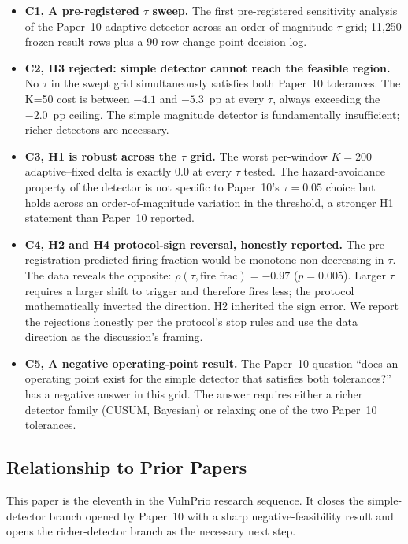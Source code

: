 \begin{itemize}
\item \textbf{C1, A pre-registered $\tau$ sweep.} The first
pre-registered sensitivity analysis of the Paper~10 adaptive detector
across an order-of-magnitude $\tau$ grid; 11{,}250 frozen result rows
plus a 90-row change-point decision log.

\item \textbf{C2, H3 rejected: simple detector cannot reach the
feasible region.} No $\tau$ in the swept grid simultaneously
satisfies both Paper~10 tolerances. The K=50 cost is between $-4.1$
and $-5.3$~pp at every $\tau$, always exceeding the $-2.0$~pp
ceiling. The simple magnitude detector is fundamentally insufficient;
richer detectors are necessary.

\item \textbf{C3, H1 is robust across the $\tau$ grid.} The
worst per-window $K = 200$ adaptive--fixed delta is exactly $0.0$ at
every $\tau$ tested. The hazard-avoidance property of the
detector is not specific to Paper~10's $\tau = 0.05$ choice but
holds across an order-of-magnitude variation in the threshold, 
a stronger H1 statement than Paper~10 reported.

\item \textbf{C4, H2 and H4 protocol-sign reversal, honestly
reported.} The pre-registration predicted firing fraction would be
monotone non-decreasing in $\tau$. The data reveals the opposite:
$\rho(\tau, \text{fire frac}) = -0.97$ ($p = 0.005$). Larger $\tau$
requires a larger shift to trigger and therefore fires less; the
protocol mathematically inverted the direction. H2 inherited the
sign error. We report the rejections honestly per the protocol's
stop rules and use the data direction as the discussion's framing.

\item \textbf{C5, A negative operating-point result.} The
Paper~10 question ``does an operating point exist for the simple
detector that satisfies both tolerances?'' has a negative answer in
this grid. The answer requires either a richer detector family
(CUSUM, Bayesian) or relaxing one of the two Paper~10 tolerances.
\end{itemize}

\subsection{Relationship to Prior Papers}

This paper is the eleventh in the VulnPrio research sequence. It
closes the simple-detector branch opened by Paper~10 with a sharp
negative-feasibility result and opens the richer-detector branch as
the necessary next step.
